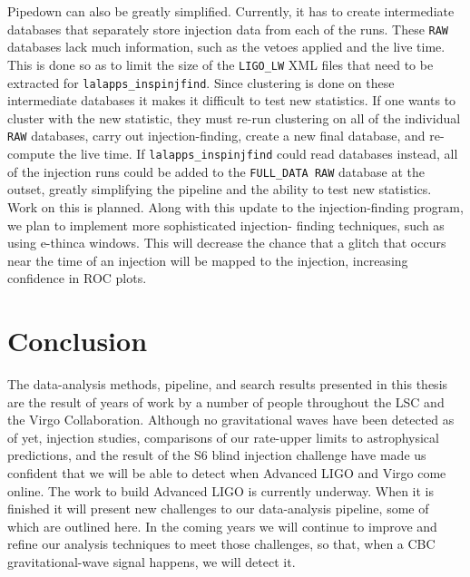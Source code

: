 Pipedown can also be greatly simplified. Currently, it has to create
intermediate databases that separately store injection data from each of the
runs. These \verb|RAW| databases lack much information, such as the vetoes
applied and the live time. This is done so as to limit the size of the
\verb|LIGO_LW| XML files that need to be extracted for
\verb|lalapps_inspinjfind|. Since clustering is done on these intermediate
databases it makes it difficult to test new statistics. If one wants to cluster
with the new statistic, they must re-run clustering on all of the individual
\verb|RAW| databases, carry out injection-finding, create a new final database,
and re-compute the live time. If \verb|lalapps_inspinjfind| could read
databases instead, all of the injection runs could be added to the
\verb|FULL_DATA RAW| database at the outset, greatly simplifying the pipeline
and the ability to test new statistics. Work on this is planned. Along with
this update to the injection-finding program, we plan to implement more
sophisticated injection- finding techniques, such as using e-thinca windows.
This will decrease the chance that a glitch that occurs near the time of an
injection will be mapped to the injection, increasing confidence in ROC plots.


\section{Conclusion}

The data-analysis methods, pipeline, and search results presented in this
thesis are the result of years of work by a number of people throughout the
\ac{LSC} and the Virgo Collaboration. Although no gravitational waves have been
detected as of yet, injection studies, comparisons of our rate-upper limits to
astrophysical predictions, and the result of the \ac{S6} blind injection
challenge have made us confident that we will be able to detect when Advanced
\ac{LIGO} and Virgo come online. The work to build Advanced \ac{LIGO} is
currently underway. When it is finished it will present new challenges to our
data-analysis pipeline, some of which are outlined here. In the coming years we
will continue to improve and refine our analysis techniques to meet those
challenges, so that, when a \ac{CBC} gravitational-wave signal happens, we will
detect it.
